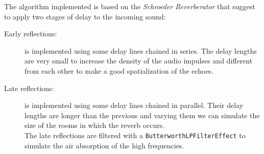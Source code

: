 \begin{description}
    The algorithm implemented is based on the
    \textit{Schroeder Reverberator}\cite{reverb} that suggest to apply
    two stages of delay to the incoming sound:
    \begin{description}
      \item[Early reflections:] is implemented using some
        delay lines chained in series. The delay lengths are very small
        to increase the density of the audio impulses and different
        from each other to make a good spatialization of the echoes.
      \item[Late reflections:] is implemented using some delay
        lines chained in parallel. Their delay lengths are longer than
        the previous and varying them we can simulate the size of the
        rooms in which the reverb occurs.\\
        The late reflections are filtered with a
        \texttt{ButterworthLPFilterEffect} to simulate the air
        absorption of the high frequencies.
    \end{description}
  
\end{description}
